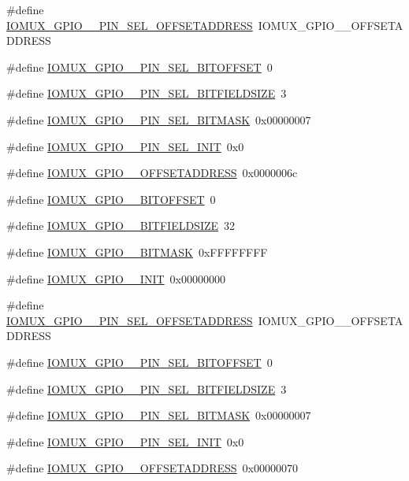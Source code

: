 \begin{DoxyCompactItemize}
\item 
\#define \hyperlink{a00560_af2f6c0aadeda0c6cc4f439a4cd0815cd}{IOMUX\_\-GPIO\_\_\-PIN\_\-SEL\_\-OFFSETADDRESS}~IOMUX\_\-GPIO\_\_\-OFFSETADDRESS
\item 
\#define \hyperlink{a00560_a0c22a78db7ca714c7fc8083ad3832a81}{IOMUX\_\-GPIO\_\_\-PIN\_\-SEL\_\-BITOFFSET}~0
\item 
\#define \hyperlink{a00560_a957e66c106d40ff686ef6104eebbab8e}{IOMUX\_\-GPIO\_\_\-PIN\_\-SEL\_\-BITFIELDSIZE}~3
\item 
\#define \hyperlink{a00560_a48dc24ed609421e59bcc84c8b85b2b8d}{IOMUX\_\-GPIO\_\_\-PIN\_\-SEL\_\-BITMASK}~0x00000007
\item 
\#define \hyperlink{a00560_aa094593fcf8489c6a23a2d04e46603fc}{IOMUX\_\-GPIO\_\_\-PIN\_\-SEL\_\-INIT}~0x0
\item 
\#define \hyperlink{a00560_a29e3204cf027abed8a935188ddd1784a}{IOMUX\_\-GPIO\_\_\-OFFSETADDRESS}~0x0000006c
\item 
\#define \hyperlink{a00560_ad6660e5e32b1e6af346b83b31e517c6d}{IOMUX\_\-GPIO\_\_\-BITOFFSET}~0
\item 
\#define \hyperlink{a00560_a53967601e64f99c95aec5fb4ad51a881}{IOMUX\_\-GPIO\_\_\-BITFIELDSIZE}~32
\item 
\#define \hyperlink{a00560_a9b714f02a42c899d61939d69c874a179}{IOMUX\_\-GPIO\_\_\-BITMASK}~0xFFFFFFFF
\item 
\#define \hyperlink{a00560_aa088f5402e3f381a8bf7d8d12ce15a77}{IOMUX\_\-GPIO\_\_\-INIT}~0x00000000
\item 
\#define \hyperlink{a00560_adc61f40b5648d128c99526e6c2e5ec42}{IOMUX\_\-GPIO\_\_\-PIN\_\-SEL\_\-OFFSETADDRESS}~IOMUX\_\-GPIO\_\_\-OFFSETADDRESS
\item 
\#define \hyperlink{a00560_ae4d6a6f22c803ce495a9836504cbb5f3}{IOMUX\_\-GPIO\_\_\-PIN\_\-SEL\_\-BITOFFSET}~0
\item 
\#define \hyperlink{a00560_afb67630faa651491204a32ef65a37e23}{IOMUX\_\-GPIO\_\_\-PIN\_\-SEL\_\-BITFIELDSIZE}~3
\item 
\#define \hyperlink{a00560_a953956abf39f3b7e8ae2e16b5de8cb30}{IOMUX\_\-GPIO\_\_\-PIN\_\-SEL\_\-BITMASK}~0x00000007
\item 
\#define \hyperlink{a00560_afe91cba85f843dbc30a890a1920ab0a6}{IOMUX\_\-GPIO\_\_\-PIN\_\-SEL\_\-INIT}~0x0
\item 
\#define \hyperlink{a00560_a7c4415d78be930e398a9b950cb9f0ed7}{IOMUX\_\-GPIO\_\_\-OFFSETADDRESS}~0x00000070
\item 

\end{DoxyCompactItemize}
